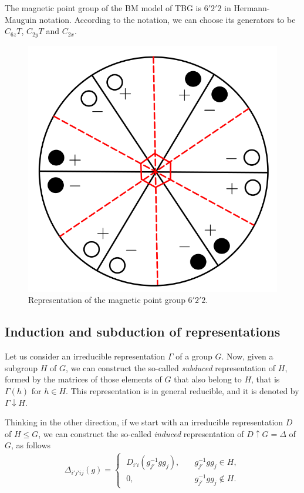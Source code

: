 The magnetic point group of the BM model of TBG is $6'2'2$ in Hermann-Mauguin notation. According to the notation, we can choose its generators to be $C_{6z} T$, $C_{2y} T$ and $C_{2x}$.

\begin{figure}[H]
\centering
\includegraphics[width=0.5\linewidth]{fig/622_magnetic.png}
\caption{Representation of the magnetic point group $6'2'2$.}
\label{fig:622_magnetic}
\end{figure}

\subsection{Induction and subduction of representations}

Let us consider an irreducible representation $\Gamma$ of a group $G$. Now, given a subgroup $H$ of $G$, we can construct the so-called \textit{subduced} representation of $H$, formed by the matrices of those elements of $G$ that also belong to $H$, that is $\Gamma(h)$ for $h \in H$. This representation is in general reducible, and it is denoted by $\Gamma \downarrow H$.

Thinking in the other direction, if we start with an irreducible representation $D$ of $H \leq G$, we can construct the so-called \textit{induced} representation of $D \uparrow G = \Delta$ of $G$, as follows
\begin{align*}
\Delta_{i'j'ij}(g) =
\begin{cases}
\; D_{i'i}(g_{j'}^{-1} g g_j), \quad & g_{j'}^{-1} g g_j \in H, \\
\; 0,  & g_{j'}^{-1} g g_j \notin H.
\end{cases}
\end{align*}






%



